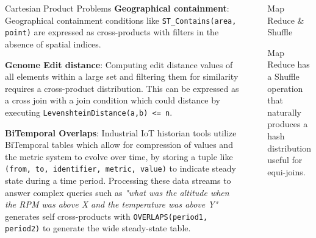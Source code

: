 \documentclass[final]{beamer}
\newlength{\sepwid}
\newlength{\onecolwid}
\newlength{\twocolwid}
\begin{document}
\begin{frame}[t]
\begin{columns}[t]
\begin{column}{\onecolwid}
\begin{block}{Cartesian Product Problems}
\textbf{Geographical containment}:
Geographical containment conditions like \texttt{ST\_Contains(area, point)} are expressed as cross-products with filters in the absence of spatial indices.

\textbf{Genome Edit distance}:
Computing edit distance values of all elements within a large set and filtering them for similarity requires a cross-product distribution. This can 
be expressed as a cross join with a join condition which could distance by executing \texttt{LevenshteinDistance(a,b) <= n}.

\textbf{BiTemporal Overlaps}:
Industrial IoT historian tools utilize BiTemporal tables which allow for compression of values and the metric system to evolve over time, by storing a
tuple like \texttt{(from, to, identifier, metric, value)} to indicate steady state during a time period.
Processing these data streams to answer complex queries such as \textit{"what was the altitude when the RPM was above X and the temperature was above Y"}
generates self cross-products with \texttt{OVERLAPS(period1, period2)} to generate the wide steady-state table.
\end{block}


\end{column} %

\begin{column}{\sepwid}\end{column} %

\begin{column}{\twocolwid} %

\begin{columns}[t,totalwidth=\twocolwid] %

\begin{column}{\onecolwid}\vspace{-.6in} %


\begin{block}{Map Reduce \& Shuffle}

Map Reduce has a Shuffle operation that naturally produces a hash distribution useful for equi-joins.


\end{block}
\end{column}
\end{columns}
\end{column}
\end{columns}
\end{frame}
\end{document}
